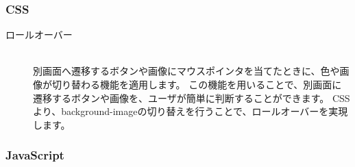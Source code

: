 \documentclass[a4j,titlepage]{jarticle}
\begin{document}
\subsubsection{CSS}
\begin{description}
\item[ロールオーバー]~\\
別画面へ遷移するボタンや画像にマウスポインタを当てたときに、色や画像が切り替わる機能を適用します。
この機能を用いることで、別画面に遷移するボタンや画像を、ユーザが簡単に判断することができます。
CSSより、background-imageの切り替えを行うことで、ロールオーバーを実現します。
\end{description}

\subsubsection{JavaScript}
\end{document}
